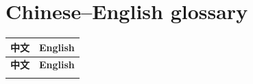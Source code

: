 \documentclass{ctexart}
\begin{document}
	\section{Chinese–English glossary}
	\begin{center}
		\setlength\LTleft{0pt}
		\setlength\LTright{0pt}
		\begin{longtable}{|>{\raggedright\arraybackslash}p{5cm}|>{\raggedright\arraybackslash}p{8cm}|}
			\hline
			\rowcolor{gray!35}
			\textbf{中文} & \textbf{English} \\
			\hline
			\endfirsthead

			\hline
			\rowcolor{gray!35}
			\textbf{中文} & \textbf{English} \\
			\hline
			\endhead

			\hline
			\endfoot

			\hline
			\endlastfoot


\end{longtable}
\end{center}
\end{document}
